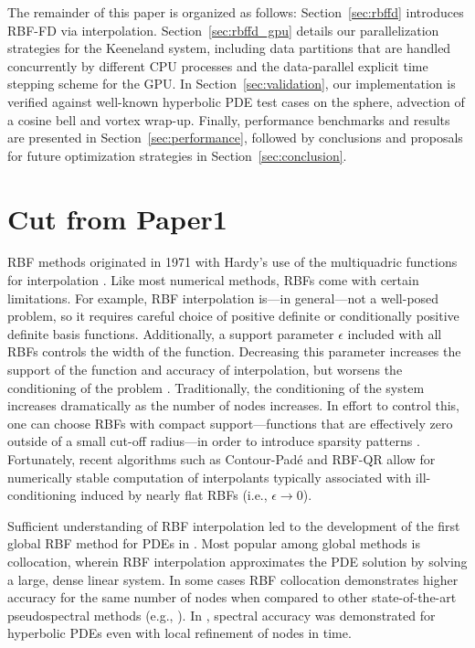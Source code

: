 The remainder of this paper is organized as follows: Section~\ref{sec:rbffd} introduces RBF-FD via interpolation. Section~\ref{sec:rbffd_gpu} details our parallelization strategies for the Keeneland system, including data partitions that are handled concurrently by different CPU processes and the data-parallel explicit time stepping scheme for the GPU. In Section~\ref{sec:validation}, our implementation is verified against well-known hyperbolic PDE test cases on the sphere, advection of a cosine bell and vortex wrap-up. Finally, performance benchmarks and results are presented in Section~\ref{sec:performance}, followed by conclusions and proposals for future optimization strategies in Section~\ref{sec:conclusion}.

\section{Cut from Paper1}

RBF methods originated in 1971 with Hardy's use of the multiquadric functions for interpolation \cite{Hardy1971}. Like most numerical methods, RBFs come with certain
limitations. For example, RBF interpolation is---in general---not a well-posed
problem, so it requires careful choice of positive definite or conditionally
positive definite basis functions. %
Additionally, a support parameter $\epsilon$ included with all RBFs controls the width of the function. Decreasing this parameter increases the support of the function and accuracy of interpolation, but worsens the conditioning of the problem \cite{Schaback1995}. Traditionally, the conditioning of the system increases dramatically as the number of
nodes increases. In effort to control this, one can choose RBFs with
compact support---functions that are effectively zero outside of a small
cut-off radius---in order to introduce sparsity patterns \cite{Fasshauer2007}. 
Fortunately, recent algorithms such as Contour-Pad\'{e} \cite{Fornberg2004} and RBF-QR \cite{Fornberg2011a} allow for numerically stable computation of interpolants typically associated with ill-conditioning induced by nearly flat RBFs (i.e., $\epsilon \rightarrow 0$). 


Sufficient understanding of RBF interpolation led to the development of the first global RBF method for PDEs in \cite{Kansa1990a}. Most popular among global methods is collocation, wherein RBF interpolation approximates the PDE solution by solving a large, dense linear system. 
In some cases RBF collocation demonstrates higher accuracy for the same number of nodes when compared to other state-of-the-art pseudospectral methods (e.g., \cite{Larsson2003} \cite{Flyer2007} \cite{Flyer2009b}). In \cite{Flyer2010}, spectral accuracy was demonstrated for hyperbolic PDEs even with local refinement of nodes in time.



